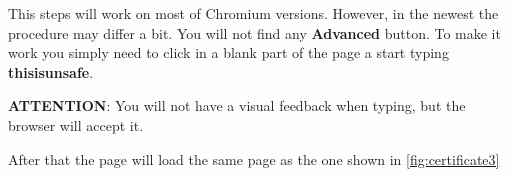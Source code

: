 This steps will work on most of Chromium versions. However, in the newest the procedure may differ a bit. You will not find any \textbf{Advanced} button. To make it work you simply need to click in a blank part of the page a start typing \textbf{thisisunsafe}.

\begin{warning}
	\textbf{ATTENTION}: You will not have a visual feedback when typing, but the browser will accept it.
\end{warning}

After that the page will load the same page as the one shown in \autoref{fig:certificate3}
